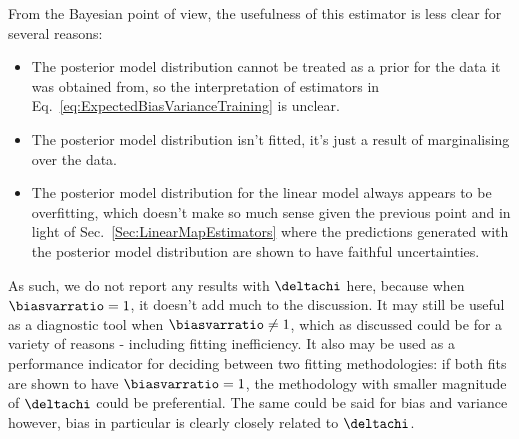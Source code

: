 From the
Bayesian point of view, the usefulness of this estimator is less clear for
several reasons:
\begin{itemize}
    \item The posterior model distribution cannot be treated as a prior for the
    data it was obtained from, so the interpretation of estimators in
    Eq.~\ref{eq:ExpectedBiasVarianceTraining} is unclear.
    \item The posterior model distribution isn't fitted, it's just a result of
    marginalising over the data.
    \item The posterior model distribution for the linear model always appears
    to be overfitting, which doesn't make so much sense given the previous
    point and in light of Sec.~\ref{Sec:LinearMapEstimators} where the predictions
    generated with the posterior model distribution are shown to have
    faithful uncertainties.
\end{itemize}
As such, we do not report any results with $\deltachi$ here, because
when $\biasvarratio = 1$, it doesn't add much to the discussion. It may still
be useful as a diagnostic tool when $\biasvarratio \neq 1$, which as discussed
could be for a variety of reasons - including fitting inefficiency. It also
may be used as a performance indicator for deciding between two fitting
methodologies: if both fits are shown to have $\biasvarratio = 1$, the
methodology with smaller magnitude of $\deltachi$ could be preferential.
The same could be said for bias and variance however, bias in particular is
clearly closely related to $\deltachi$.
